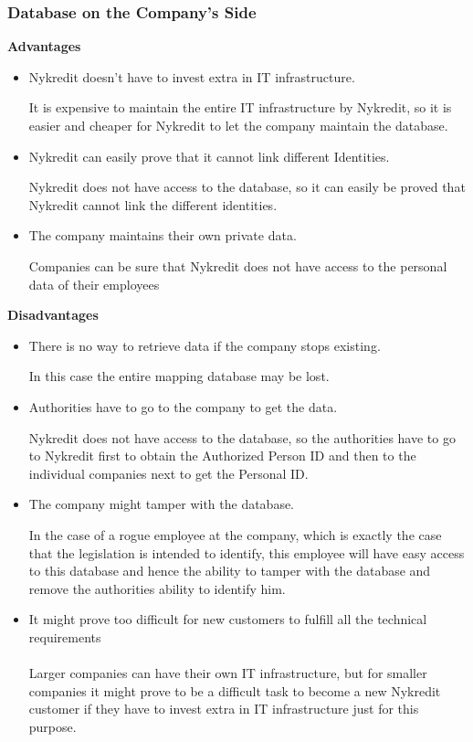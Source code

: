 \subsubsection{Database on the Company's Side}
\textbf{Advantages}
\begin{itemize}
	\item Nykredit doesn’t have to invest extra in IT infrastructure.
	
	It is expensive to maintain the entire IT infrastructure by Nykredit, so it is easier and cheaper for Nykredit to let the company maintain the database.
	\item Nykredit can easily prove that it cannot link different Identities.
	
	Nykredit does not have access to the database, so it can easily be proved that Nykredit cannot link the different identities.
	\item The company maintains their own private data.
	
	Companies can be sure that Nykredit does not have access to the personal data of their employees
\end{itemize}
\textbf{Disadvantages}
\begin{itemize}
	
	\item There is no way to retrieve data if the company stops existing.
	
	In this case the entire mapping database may be lost.
	\item Authorities have to go to the company to get the data.
	
	Nykredit does not have access to the database, so the authorities have to go to Nykredit first to obtain the Authorized Person ID and then to the individual companies next to get the Personal ID.
	\item The company might tamper with the database.
	
	In the case of a rogue employee at the company, which is exactly the case that the legislation is intended to identify, this employee will have easy access to this database and hence the ability to tamper with the database and remove the authorities ability to identify him.
	\item It might prove too difficult for new customers to fulfill all the technical requirements 
	\\
	\\Larger companies can have their own IT infrastructure, but for smaller companies it might prove to be a difficult task to become a new Nykredit customer if they have to invest extra in IT infrastructure just for this purpose.
\end{itemize}

